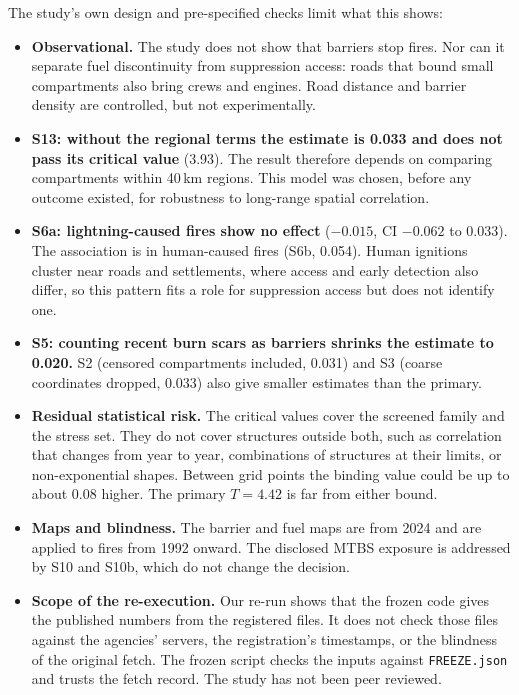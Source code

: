 \documentclass[11pt]{article}
\begin{document}
The study's own design and pre-specified checks limit what this shows:
\begin{itemize}
\item \textbf{Observational.} The study does not show that barriers stop fires. Nor can it separate fuel discontinuity from suppression access:
  roads that bound small compartments also bring crews and engines. Road distance and barrier density are controlled, but not experimentally.
\item \textbf{S13: without the regional terms the estimate is 0.033 and does not pass its critical value} (3.93). The result therefore depends on
  comparing compartments within 40\,km regions. This model was chosen, before any outcome existed, for robustness to long-range spatial correlation.
\item \textbf{S6a: lightning-caused fires show no effect} ($-0.015$, CI $-0.062$ to $0.033$). The association is in human-caused fires (S6b, 0.054).
  Human ignitions cluster near roads and settlements, where access and early detection also differ, so this pattern fits a role for
  suppression access but does not identify one.
\item \textbf{S5: counting recent burn scars as barriers shrinks the estimate to 0.020.} S2 (censored compartments included, 0.031) and S3
  (coarse coordinates dropped, 0.033) also give smaller estimates than the primary.
\item \textbf{Residual statistical risk.} The critical values cover the screened family and the stress set. They do not cover structures outside both,
  such as correlation that changes from year to year, combinations of structures at their limits, or non-exponential shapes. Between grid points the binding
  value could be up to about 0.08 higher. The primary $T=4.42$ is far from either bound.
\item \textbf{Maps and blindness.} The barrier and fuel maps are from 2024 and are applied to fires from 1992 onward. The disclosed MTBS exposure is addressed by S10 and
  S10b, which do not change the decision.
\item \textbf{Scope of the re-execution.} Our re-run shows that the frozen code gives the published numbers from the registered files. It does not check those files against the agencies'
  servers, the registration's timestamps, or the blindness of the original fetch. The frozen script checks the inputs against \texttt{FREEZE.json} and
  trusts the fetch record. The study has not been peer reviewed.
\end{itemize}
\end{document}
